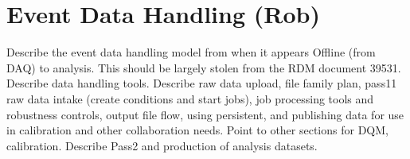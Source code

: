 \section{Event Data Handling (Rob)}
Describe the event data handling model from when it appears Offline (from DAQ) to analysis.  This should be largely stolen from the RDM document 39531.  Describe data handling tools. Describe raw data upload, file family plan, pass11 raw data intake (create conditions and start jobs), job processing tools and robustness controls, output file flow, using persistent, and publishing data for use in calibration and other collaboration needs. Point to other sections for DQM, calibration.  Describe Pass2 and production of analysis datasets.
